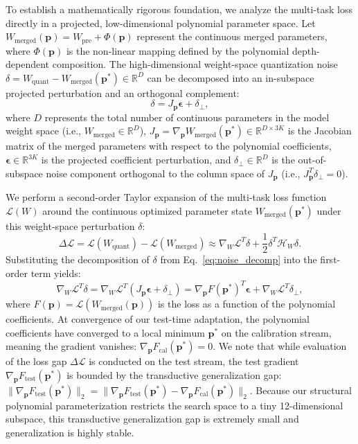 To establish a mathematically rigorous foundation, we analyze the multi-task loss directly in a projected, low-dimensional polynomial parameter space. Let $W_{\text{merged}}(\mathbf{p}) = W_{\text{pre}} + \Phi(\mathbf{p})$ represent the continuous merged parameters, where $\Phi(\mathbf{p})$ is the non-linear mapping defined by the polynomial depth-dependent composition. The high-dimensional weight-space quantization noise $\delta = W_{\text{quant}} - W_{\text{merged}}(\mathbf{p}^*) \in \mathbb{R}^D$ can be decomposed into an in-subspace projected perturbation and an orthogonal complement:
\begin{equation}
\label{eq:noise_decomp}
    \delta = J_{\mathbf{p}} \boldsymbol{\epsilon} + \delta_{\perp},
\end{equation}
where $D$ represents the total number of continuous parameters in the model weight space (i.e., $W_{\text{merged}} \in \mathbb{R}^D$), $J_{\mathbf{p}} = \nabla_{\mathbf{p}} W_{\text{merged}}(\mathbf{p}^*) \in \mathbb{R}^{D \times 3K}$ is the Jacobian matrix of the merged parameters with respect to the polynomial coefficients, $\boldsymbol{\epsilon} \in \mathbb{R}^{3K}$ is the projected coefficient perturbation, and $\delta_{\perp} \in \mathbb{R}^D$ is the out-of-subspace noise component orthogonal to the column space of $J_{\mathbf{p}}$ (i.e., $J_{\mathbf{p}}^T \delta_{\perp} = 0$).

We perform a second-order Taylor expansion of the multi-task loss function $\mathcal{L}(W)$ around the continuous optimized parameter state $W_{\text{merged}}(\mathbf{p}^*)$ under this weight-space perturbation $\delta$:
\begin{equation}
    \Delta \mathcal{L} = \mathcal{L}(W_{\text{quant}}) - \mathcal{L}(W_{\text{merged}}) \approx \nabla_W \mathcal{L}^T \delta + \frac{1}{2} \delta^T \mathcal{H}_W \delta.
\end{equation}
Substituting the decomposition of $\delta$ from Eq.~\ref{eq:noise_decomp} into the first-order term yields:
\begin{equation}
    \nabla_W \mathcal{L}^T \delta = \nabla_W \mathcal{L}^T (J_{\mathbf{p}} \boldsymbol{\epsilon} + \delta_{\perp}) = \nabla_{\mathbf{p}} F(\mathbf{p}^*)^T \boldsymbol{\epsilon} + \nabla_W \mathcal{L}^T \delta_{\perp},
\end{equation}
where $F(\mathbf{p}) = \mathcal{L}(W_{\text{merged}}(\mathbf{p}))$ is the loss as a function of the polynomial coefficients. At convergence of our test-time adaptation, the polynomial coefficients have converged to a local minimum $\mathbf{p}^*$ on the calibration stream, meaning the gradient vanishes: $\nabla_{\mathbf{p}} F_{\text{cal}}(\mathbf{p}^*) = 0$. We note that while evaluation of the loss gap $\Delta \mathcal{L}$ is conducted on the test stream, the test gradient $\nabla_{\mathbf{p}} F_{\text{test}}(\mathbf{p}^*)$ is bounded by the transductive generalization gap: $\|\nabla_{\mathbf{p}} F_{\text{test}}(\mathbf{p}^*)\|_2 = \|\nabla_{\mathbf{p}} F_{\text{test}}(\mathbf{p}^*) - \nabla_{\mathbf{p}} F_{\text{cal}}(\mathbf{p}^*)\|_2$. Because our structural polynomial parameterization restricts the search space to a tiny 12-dimensional subspace, this transductive generalization gap is extremely small and generalization is highly stable. 

